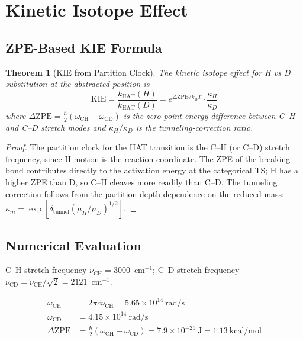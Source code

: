 \documentclass[11pt,twocolumn,a4paper]{article}
\newtheorem{theorem}{Theorem}[section]
\theoremstyle{definition}
\theoremstyle{remark}
\newcommand{\kB}{k_{\mathrm{B}}}
\newcommand{\kHAT}{k_{\mathrm{HAT}}}
\newcommand{\KIEval}{\mathrm{KIE}}
\begin{document}
\section{Kinetic Isotope Effect}
\label{sec:kie}

\subsection{ZPE-Based KIE Formula}

\begin{theorem}[KIE from Partition Clock]
\label{thm:kie}
The kinetic isotope effect for H vs D substitution at the abstracted
position is
\begin{equation}
\KIEval = \frac{\kHAT(H)}{\kHAT(D)}
= e^{\Delta\mathrm{ZPE}/\kB T} \cdot \frac{\kappa_H}{\kappa_D}
\label{eq:kie}
\end{equation}
where $\Delta\mathrm{ZPE} = \tfrac{\hbar}{2}(\omega_{\mathrm{CH}} - \omega_{\mathrm{CD}})$
is the zero-point energy difference between C--H and C--D stretch modes and
$\kappa_H/\kappa_D$ is the tunneling-correction ratio.
\end{theorem}

\begin{proof}
The partition clock for the HAT transition is the C--H (or C--D) stretch
frequency, since H motion is the reaction coordinate. The ZPE of the
breaking bond contributes directly to the activation energy at the
categorical TS; H has a higher ZPE than D, so C--H cleaves more readily
than C--D. The tunneling correction follows from the partition-depth
dependence on the reduced mass: $\kappa_m = \exp[\delta_{\mathrm{tunnel}}
(\mu_H/\mu_D)^{1/2}]$.
\end{proof}

\subsection{Numerical Evaluation}

C--H stretch frequency $\tilde\nu_{\mathrm{CH}} = 3000$~cm$^{-1}$;
C--D stretch frequency $\tilde\nu_{\mathrm{CD}} = \tilde\nu_{\mathrm{CH}}/\sqrt{2}
= 2121$~cm$^{-1}$.

\begin{align}
\omega_{\mathrm{CH}} &= 2\pi c \tilde\nu_{\mathrm{CH}} = 5.65 \times 10^{14}~\mathrm{rad/s}\\
\omega_{\mathrm{CD}} &= 4.15 \times 10^{14}~\mathrm{rad/s}\\
\Delta\mathrm{ZPE} &= \tfrac{\hbar}{2}(\omega_{\mathrm{CH}} - \omega_{\mathrm{CD}})
= 7.9 \times 10^{-21}~\mathrm{J} = 1.13~\mathrm{kcal/mol}
\end{align}
\end{document}

